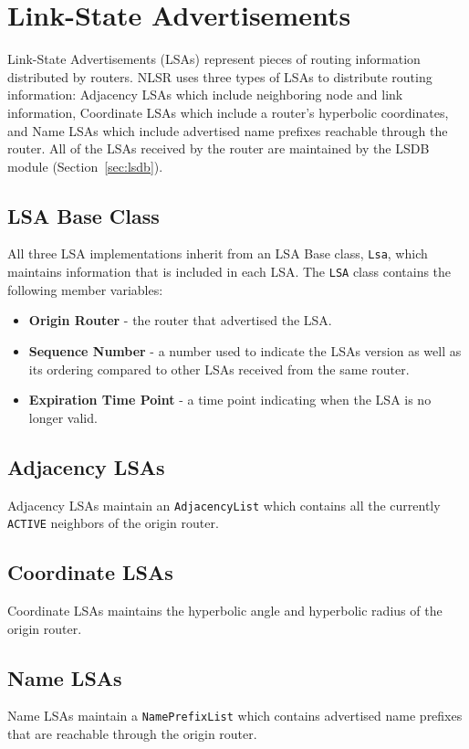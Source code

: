 \section{Link-State Advertisements}
\label{sec:lsas}

Link-State Advertisements (LSAs) represent pieces of routing information distributed by routers.
NLSR uses three types of LSAs to distribute routing information:
Adjacency LSAs which include neighboring node and link information,
Coordinate LSAs which include a router's hyperbolic coordinates, and
Name LSAs which include advertised name prefixes reachable through the router.
All of the LSAs received by the router are maintained by the LSDB module (Section~\ref{sec:lsdb}).

\subsection{LSA Base Class}
\label{sec:lsa-base-class}

All three LSA implementations inherit from an LSA Base class, \texttt{Lsa}, which maintains information that is included in each LSA.
The \texttt{LSA} class contains the following member variables:
\begin{itemize}
\item \textbf{Origin Router} - the router that advertised the LSA.
\item \textbf{Sequence Number} - a number used to indicate the LSAs version as well as its ordering compared to other LSAs received from the same router.
\item \textbf{Expiration Time Point} - a time point indicating when the LSA is no longer valid.
\end{itemize} 

\subsection{Adjacency LSAs}
\label{sec:adjacency-lsas}

Adjacency LSAs maintain an \texttt{AdjacencyList} which contains all the currently \texttt{ACTIVE} neighbors of the origin router.

\subsection{Coordinate LSAs}
\label{sec:coordinate-lsas}

Coordinate LSAs maintains the hyperbolic angle and hyperbolic radius of the origin router.

\subsection{Name LSAs}
\label{sec:name-lsas}

Name LSAs maintain a \texttt{NamePrefixList} which contains advertised name prefixes that are reachable through the origin router.